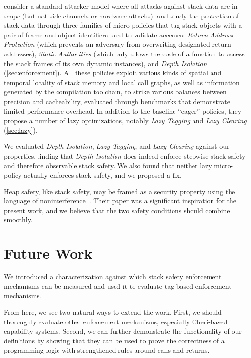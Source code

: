 \documentclass[acmsmall,review,anonymous]{acmart}\settopmatter{printfolios=true,printccs=false,printacmref=false}
\begin{document}
{{
%
\citet{DBLP:conf/sp/RoesslerD18} consider a standard attacker model where all
attacks against stack data are in scope (but not side channels or hardware
attacks), and study the protection of stack data through three families of
micro-policies that tag stack objects with a pair of frame and object identifiers
used to validate accesses: {\em Return Address Protection} (which
prevents an adversary from overwriting designated return addresses), {\em Static
Authorities} (which only allows the code of a function to access the stack frames
of its own dynamic instances), and {\em Depth Isolation}
(\cref{sec:enforcement}). All these policies exploit various kinds of spatial and
temporal locality of stack memory and local call graphs, as well as information
generated by the compilation toolchain, to strike various balances between
precision and cacheability, evaluated through benchmarks that demonstrate
limited performance overhead. In addition to the baseline ``eager'' policies,
they propose a number of lazy optimizations, notably {\em Lazy Tagging} and
{\em Lazy
Clearing} (\cref{sec:lazy}).

We evaluated {\em Depth Isolation}, {\em Lazy Tagging}, and {\em Lazy
  Clearing} against our properties, finding that {\em Depth Isolation} does
indeed enforce stepwise stack safety and therefore observable stack
safety. We also found that neither lazy micro-policy actually enforces
stack safety, and we proposed a fix.

%
Heap safety, like stack safety, may be framed as a security property using
the language of
noninterference~\citep{DBLP:conf/post/AmorimHP18}. Their paper was a significant inspiration
for the present work, and we believe that the two safety conditions should
combine smoothly.

\section{Future Work}
\label{sec:future}

We introduced a characterization against which stack safety enforcement
mechanisms can be measured and used it to evaluate tag-based enforcement mechanisms.

From here, we see two natural ways to extend the work. First, we should thoroughly evaluate
other enforcement mechanisms, especially Cheri-based capability
systems. Second, we can further demonstrate
the functionality of our definitions by showing that they can be used to prove
the correctness of a programming logic with strengthened rules around calls and returns.

}}
\end{document}

